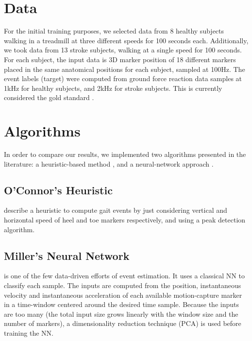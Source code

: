 \documentclass{acm_proc_article-sp}
\begin{document}
\maketitle

\section{Data}
For the initial training purposes, we selected data from 8 healthy subjects walking in a treadmill at three different speeds for 100 seconds each. Additionally, we took data from 13 stroke subjects, walking at a single speed for 100 seconds. For each subject, the input data is 3D marker position of 18 different markers placed in the same anatomical positions for each subject, sampled at 100Hz. The event labels (target) were computed from ground force reaction data samples at 1kHz for healthy subjects, and 2kHz for stroke subjects. This is currently considered the gold standard \cite{miller_gait_2009,miller_gait_2009,Hreljac2000}. \\
\section{Algorithms}

In order to compare our results, we implemented two algorithms presented in the literature: a heuristic-based method \cite{oconnor_automatic_2007}, and a neural-network approach \cite{miller_gait_2009}.

\subsection{O'Connor's Heuristic}
\citet{oconnor_automatic_2007} describe a heuristic to compute gait events by just considering vertical and horizontal speed of heel and toe markers respectively, and using a peak detection algorithm.

\subsection{Miller's Neural Network}
\citet{miller_gait_2009} is one of the few data-driven efforts of event estimation. It uses a classical NN to classify each sample. The inputs are computed from the position, instantaneous velocity and instantaneous acceleration of each available motion-capture marker in a time-window centered around the desired time sample. Because the inputs are too many (the total input size grows linearly with the window size and the number of markers), a dimensionality reduction technique (PCA) is used before training the NN.
\end{document}
